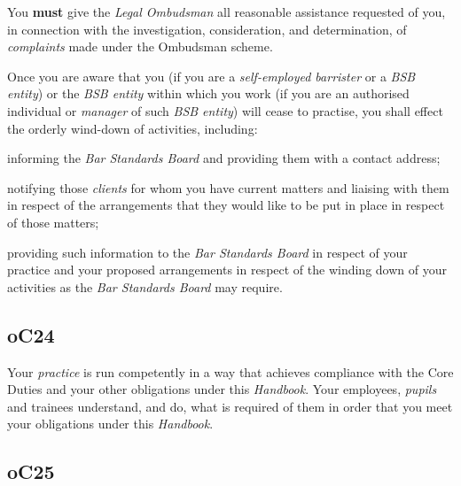 
You \textcolor{myred}{\textbf{must}} give the \emph{Legal Ombudsman} all reasonable assistance
requested of you, in connection with the investigation, consideration,
and determination, of \emph{complaints} made under the Ombudsman scheme.




Once you are aware that you (if you are a \emph{self-employed barrister}
or a \emph{BSB entity}) or the \emph{BSB entity} within which you work
(if you are an authorised individual or \emph{manager} of such \emph{BSB
entity}) will cease to practise, you shall effect the orderly wind-down
of activities, including:
\begin{numlist}
\item informing the \emph{Bar Standards Board} and providing them with a
contact address;

\item notifying those \emph{clients} for whom you have current matters and
liaising with them in respect of the arrangements that they would like
to be put in place in respect of those matters;

\item providing such information to the \emph{Bar Standards Board} in
respect of your practice and your proposed arrangements in respect of
the winding down of your activities as the \emph{Bar Standards Board}
may require.
\end{numlist}





\subsection{\color{bleu}oC24}

Your \emph{practice} is run competently in a way that achieves
compliance with the Core Duties and your other obligations under this
\emph{Handbook}. Your employees, \emph{pupils} and trainees understand,
and do, what is required of them in order that you meet your obligations
under this \emph{Handbook}.

\subsection{\color{bleu}oC25}


